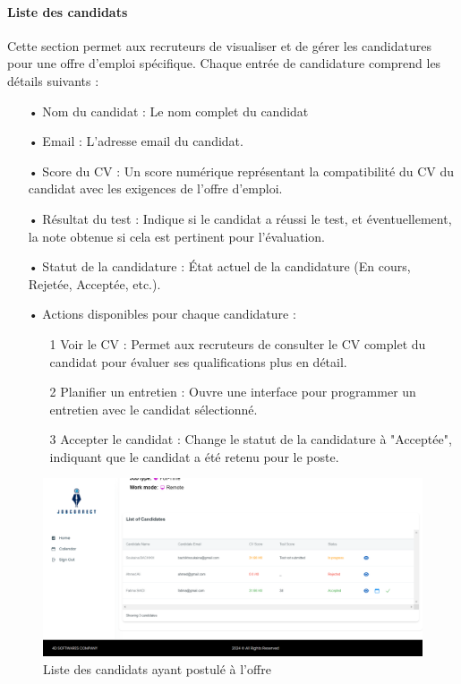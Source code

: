 \paragraph*{Liste des candidats}
Cette section permet aux recruteurs de visualiser et de gérer les candidatures pour une offre d'emploi spécifique. Chaque entrée de candidature comprend les détails suivants :
\begin{itemize}
   \item[•] Nom du candidat : Le nom complet du candidat
   \item[•] Email : L'adresse email du candidat.
   \item[•] Score du CV : Un score numérique représentant la compatibilité du CV du candidat avec les exigences de l'offre d'emploi.
   \item[•] Résultat du test : Indique si le candidat a réussi le test, et éventuellement, la note obtenue si cela est pertinent pour l'évaluation.
   \item[•] Statut de la candidature : État actuel de la candidature (En cours, Rejetée, Acceptée, etc.).
   \item[•] Actions disponibles pour chaque candidature :
      \begin{itemize}
         \item[1] Voir le CV : Permet aux recruteurs de consulter le CV complet du candidat pour évaluer ses qualifications plus en détail.
         \item[2] Planifier un entretien : Ouvre une interface pour programmer un entretien avec le candidat sélectionné.
         \item[3] Accepter le candidat : Change le statut de la candidature à "Acceptée", indiquant que le candidat a été retenu pour le poste. 
         \newline
         \newline
      \end{itemize}
\end{itemize}
\vspace{3cm}
\begin{figure}[htbp]
   \centering
   \includegraphics[scale=0.18]{screens/listCandidates.png}
   \caption{Liste des candidats ayant postulé à l'offre}
   \label{fig:chihaja}
\end{figure}

